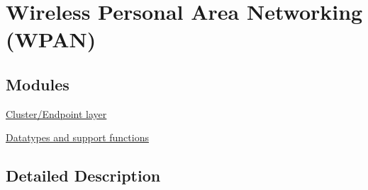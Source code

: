 \hypertarget{group__wpan}{}\section{Wireless Personal Area Networking (W\+P\+AN)}
\label{group__wpan}
\subsection*{Modules}
\begin{DoxyCompactItemize}
\item 
\hyperlink{group__wpan__aps}{Cluster/\+Endpoint layer}
\item 
\hyperlink{group__wpan__types}{Datatypes and support functions}
\end{DoxyCompactItemize}


\subsection{Detailed Description}

